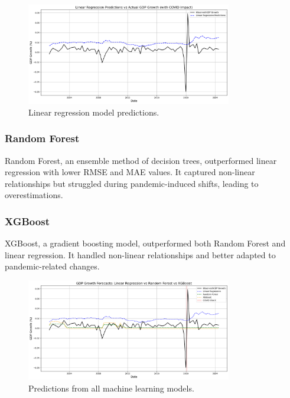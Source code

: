 \begin{figure}[ht]
    \centering
    \includegraphics[width=0.8\textwidth]{../images/lr.png}
    \caption{Linear regression model predictions.}
    \label{fig:linear_regression_predictions}
\end{figure}

\subsubsection{Random Forest}
\label{subsubsec:random_forest}

Random Forest, an ensemble method of decision trees, outperformed linear regression with lower RMSE and MAE values. It captured non-linear relationships but struggled during pandemic-induced shifts, leading to overestimations.

\subsubsection{XGBoost}
\label{subsubsec:xgboost}

XGBoost, a gradient boosting model, outperformed both Random Forest and linear regression. It handled non-linear relationships and better adapted to pandemic-related changes.

\begin{figure}[ht]
    \centering
    \includegraphics[width=0.8\textwidth]{../images/all-ml-models.png}
    \caption{Predictions from all machine learning models.}
    \label{fig:all-ml-models}
\end{figure}

